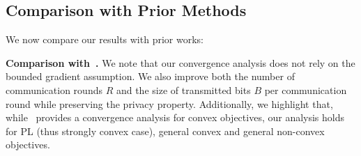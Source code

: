\documentclass[twoside]{article}
\begin{document}

\vspace{-0.05in}
\subsection{Comparison with Prior Methods} 
\vspace{-0.1in}
We now compare our results with prior works:

\vspace{0.05in}\noindent\textbf{Comparison with~\cite{li2019privacy}.} We note that our convergence analysis does not rely on the bounded gradient assumption. We also improve both the number of communication rounds $R$ and the size of transmitted bits $B$ per communication round while preserving the privacy property. 
Additionally, we highlight that, while~\cite{li2019privacy} provides a convergence analysis for convex objectives, our analysis holds for PL (thus strongly convex case), general convex and general non-convex objectives.
\end{document}
